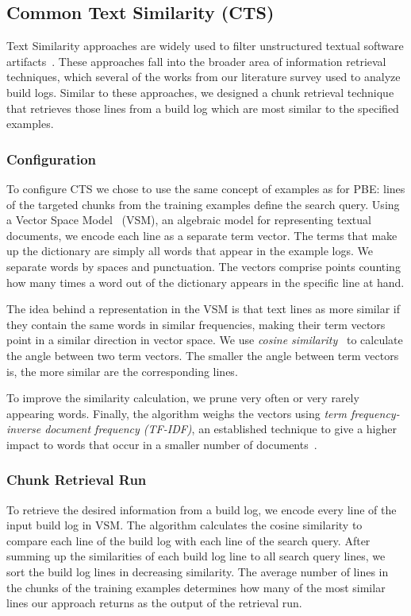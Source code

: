 \subsection{Common Text Similarity (CTS)}
Text Similarity approaches are widely used to filter unstructured
textual software artifacts~\cite{runeson2007detection,
marcus2005recovery,antoniol2002recovering,mccarey2006recommending}.
These approaches fall into the broader area of information retrieval
techniques, which several of the works from our literature survey
used to analyze build logs.
Similar to these approaches, we designed a chunk retrieval
technique that
retrieves those lines from a build log which are most
similar to the specified examples.

\subsubsection{Configuration}
To configure CTS we chose to use the same concept of examples as for
PBE: lines of the targeted chunks from the training examples define
the search query.
Using a Vector Space
Model~\cite{schutze2008introduction} (VSM), an algebraic model for
representing textual documents, we encode each line as a separate term
vector.
The terms that make up the dictionary are simply all words
that appear in the example logs.
We separate words by spaces and
punctuation.
The vectors comprise points counting
how many times a word out of the dictionary appears in the specific
line at hand.

The idea behind a representation in the VSM is that text lines as more
similar if they contain the same words in similar frequencies,
making their term vectors point in a similar direction in vector
space.
We use \emph{cosine similarity}~\cite{korenius2007principal}
to calculate the angle between two term vectors.
The smaller the
angle between term vectors is, the more similar are the corresponding
lines.

To improve the similarity calculation, we prune very often or
very rarely appearing words.
Finally, the
algorithm weighs the vectors using \emph{term frequency-inverse
document frequency (TF-IDF)}, an established technique to give a higher
impact to words that occur in a smaller number of
documents~\cite{lee1997document}.

\subsubsection{Chunk Retrieval Run}
To retrieve the desired information from a build log, we encode every
line of the input build log in VSM.
The algorithm calculates the cosine
similarity to compare each line of the
build log with each line of the search query.
After summing up the
similarities of each build log line to all search query lines, we sort
the build log lines in decreasing similarity.
The average number of
lines in the chunks of the training examples determines how many of
the most similar lines our approach returns as the output of the retrieval
run.

